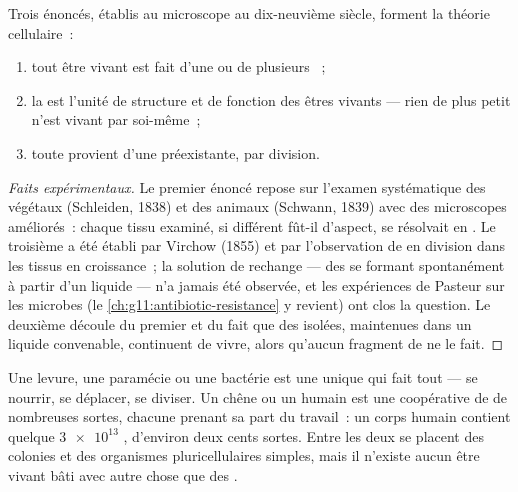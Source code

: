 \begin{proposition}\label{prop:g10:cells-common-unit:theory}
Trois énoncés, établis au microscope au dix-neuvième siècle, forment la
théorie cellulaire~:
\begin{enumerate}
  \item tout être vivant est fait d'une ou de plusieurs ~;
  \item la  est l'unité de structure et de fonction des êtres
        vivants --- rien de plus petit n'est vivant par soi-même~;
  \item toute  provient d'une  préexistante, par division.
\end{enumerate}
\end{proposition}
\begin{proof}[Faits expérimentaux]
Le premier énoncé repose sur l'examen systématique des végétaux
(Schleiden, 1838) et des animaux (Schwann, 1839) avec des microscopes
améliorés~: chaque tissu examiné, si différent fût-il d'aspect, se
résolvait en . Le troisième a été établi par Virchow (1855) et
par l'observation de  en division dans les tissus en
croissance~; la solution de rechange --- des  se formant
spontanément à partir d'un liquide --- n'a jamais été observée, et les
expériences de Pasteur sur les microbes (le
\cref{ch:g11:antibiotic-resistance} y revient) ont clos la question. Le
deuxième découle du premier et du fait que des  isolées,
maintenues dans un liquide convenable, continuent de vivre, alors
qu'aucun fragment de  ne le fait.
\end{proof}

\begin{example}\label{ex:g10:cells-common-unit:onemany}
Une levure, une paramécie ou une bactérie est une  unique qui
fait tout --- se nourrir, se déplacer, se diviser. Un chêne ou un
humain est une coopérative de  de nombreuses sortes, chacune
prenant sa part du travail~: un corps humain contient quelque
$\num{3e13}$ , d'environ deux cents sortes. Entre les deux se
placent des colonies et des organismes pluricellulaires simples, mais
il n'existe aucun être vivant bâti avec autre chose que des .
\end{example}

